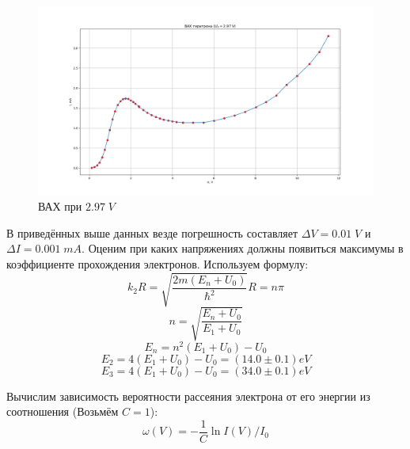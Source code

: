 \documentclass{article}
\begin{document}
\begin{figure}[H]
	\centering
	\includegraphics[width=\textwidth]{2.97.png}
	\caption{ВАХ при \(2.97\;V\)}
\end{figure}

В приведённых выше данных везде погрешность составляет \(\Delta V = 0.01\;V\) и
\(\Delta I = 0.001\;mA\).
Оценим при каких напряжениях должны появиться максимумы в коэффициенте прохождения электронов.
Используем формулу:
\[ k_2R = \sqrt{\frac{2m(E_n + U_0)}{\hbar^2}}R = n\pi\]
\[ n = \sqrt{\frac{E_n + U_0}{E_1 + U_0}} \]
\[ E_n = n^2\left(E_1 + U_0\right) - U_0 \]
\[ E_2 = 4\left(E_1 + U_0\right) - U_0 = (14.0 \pm 0.1) eV\]
\[ E_3 = 4\left(E_1 + U_0\right) - U_0 = (34.0 \pm 0.1) eV\]

Вычислим зависимость вероятности рассеяния электрона от его энергии из соотношения (Возьмём 
\(C = 1\)):
\[ \omega\left(V\right) = -\frac{1}{C}\ln{I(V)/I_0} \]
\end{document}
